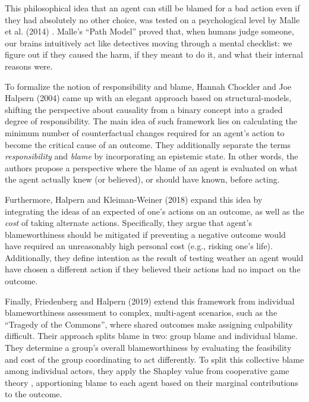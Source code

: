 \documentclass{article}
\begin{document}
This philosophical idea that an agent can still be blamed for a bad action even if they had absolutely no other choice, was tested on a psychological level by Malle et al. (2014) \cite{malle_theory_2014}. Malle's ``Path Model'' proved that, when humans judge someone, our brains intuitively act like detectives moving through a mental checklist: we figure out if they caused the harm, if they meant to do it, and what their internal reasons were.

To formalize the notion of responsibility and blame, Hannah Chockler and Joe Halpern (2004) \cite{chockler_responsibility_2004} came up with an elegant approach based on structural-models, shifting the perspective about causality from a binary concept into a graded degree of responsibility. The main idea of such framework lies on calculating the minimum number of counterfactual changes required for an agent's action to become the critical cause of an outcome. They additionally separate the terms \textit{responsibility} and \textit{blame} by incorporating an epistemic state. In other words, the authors propose a perspective where the blame of an agent is evaluated on what the agent actually knew (or believed), or should have known, before acting.

Furthermore, Halpern and Kleiman-Weiner (2018) \cite{halpern_towards_2018} expand this idea by integrating the ideas of an expected  of one's actions on an outcome, as well as the \textit{cost} of taking alternate actions. Specifically, they argue that agent's blameworthiness should be mitigated if preventing a negative outcome would have required an unreasonably high personal cost (e.g., risking one's life). Additionally, they define intention as the result of testing weather an agent would have chosen a different action if they believed their actions had no impact on the outcome.

Finally, Friedenberg and Halpern (2019) \cite{friedenberg_blameworthiness_2019} extend this framework from individual blameworthiness assessment to complex, multi-agent scenarios, such as the ``Tragedy of the Commons'', where shared outcomes make assigning culpability difficult. Their approach splits blame in two: group blame and individual blame. They determine a group's overall blameworthiness by evaluating the feasibility and cost of the group coordinating to act differently. To split this collective blame among individual actors, they apply the Shapley value from cooperative game theory \cite{shapley_value_nodate}, apportioning blame to each agent based on their marginal contributions to the outcome.
\end{document}
